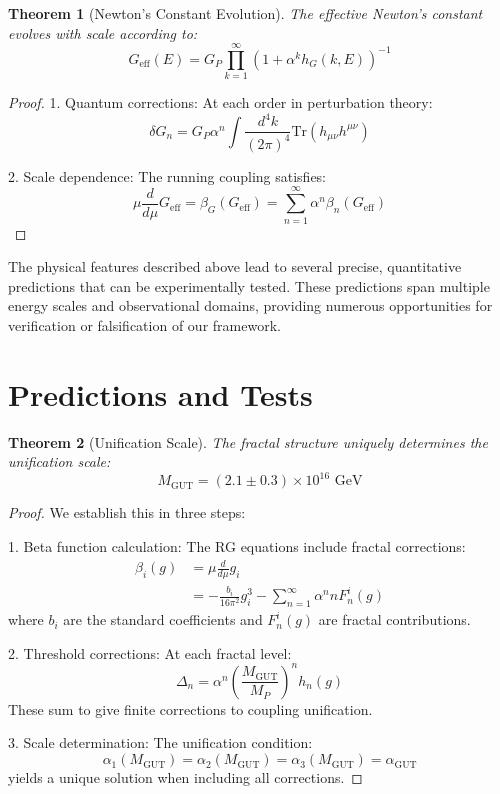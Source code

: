 \documentclass[12pt]{article}
\newtheorem{theorem}{Theorem}[section]
\begin{document}
\begin{theorem}[Newton's Constant Evolution]
The effective Newton's constant evolves with scale according to:
\[
G_{\text{eff}}(E) = G_P \prod_{k=1}^{\infty} (1 + \alpha^k h_G(k,E))^{-1}
\]
\end{theorem}

\begin{proof}
1. Quantum corrections:
   At each order in perturbation theory:
   \[
   \delta G_n = G_P \alpha^n \int \frac{d^4k}{(2\pi)^4} \text{Tr}(h_{\mu\nu}h^{\mu\nu})
   \]

2. Scale dependence:
   The running coupling satisfies:
   \[
   \mu\frac{d}{d\mu}G_{\text{eff}} = \beta_G(G_{\text{eff}}) = \sum_{n=1}^{\infty} \alpha^n \beta_n(G_{\text{eff}})
   \]
\end{proof}

The physical features described above lead to several precise, quantitative predictions that can be experimentally tested. These predictions span multiple energy scales and observational domains, providing numerous opportunities for verification or falsification of our framework.

\section{Predictions and Tests}

\label{sec:predictions}

\begin{theorem}[Unification Scale]
The fractal structure uniquely determines the unification scale:
\[
M_{\text{GUT}} = (2.1 \pm 0.3) \times 10^{16} \text{ GeV}
\]
\end{theorem}

\begin{proof}
We establish this in three steps:

1. Beta function calculation:
   The RG equations include fractal corrections:
   \begin{align*}
   \beta_i(g) &= \mu\frac{d}{d\mu}g_i \\
   &= -\frac{b_i}{16\pi^2}g_i^3 - \sum_{n=1}^{\infty} \alpha^n n F_n^i(g)
   \end{align*}
   where $b_i$ are the standard coefficients and $F_n^i(g)$ are fractal contributions.

2. Threshold corrections:
   At each fractal level:
   \[
   \Delta_n = \alpha^n \left(\frac{M_{\text{GUT}}}{M_P}\right)^n h_n(g)
   \]
   These sum to give finite corrections to coupling unification.

3. Scale determination:
   The unification condition:
   \[
   \alpha_1(M_{\text{GUT}}) = \alpha_2(M_{\text{GUT}}) = \alpha_3(M_{\text{GUT}}) = \alpha_{\text{GUT}}
   \]
   yields a unique solution when including all corrections.
\end{proof}
\end{document}
